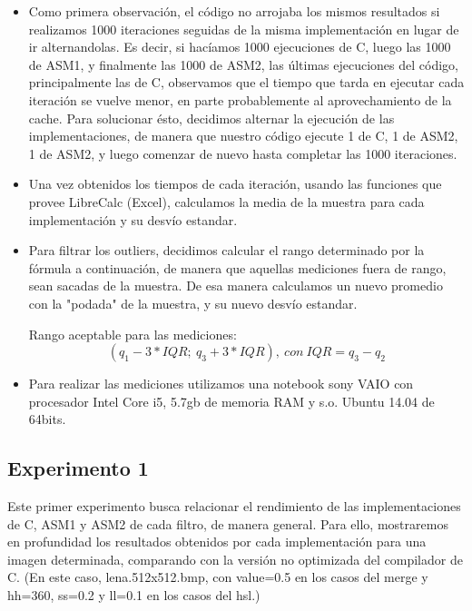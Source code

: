 \begin{itemize}
\item {Como primera observación, el código no arrojaba los mismos resultados si realizamos 1000 iteraciones seguidas de la misma implementación en lugar de ir alternandolas. Es decir, si hacíamos 1000 ejecuciones de C, luego las 1000 de ASM1, y finalmente las 1000 de ASM2, las últimas ejecuciones del código, principalmente las de C, observamos que el tiempo que tarda en ejecutar cada iteración se vuelve menor, en parte probablemente al aprovechamiento de la cache. Para solucionar ésto, decidimos alternar la ejecución de las implementaciones, de manera que nuestro código ejecute 1 de C, 1 de ASM2, 1 de ASM2, y luego comenzar de nuevo hasta completar las 1000 iteraciones.}

\item {Una vez obtenidos los tiempos de cada iteración, usando las funciones que provee LibreCalc (Excel), calculamos la media de la muestra para cada implementación y su desvío estandar.}

\item {Para filtrar los outliers, decidimos calcular el rango determinado por la fórmula a continuación, de manera que aquellas mediciones fuera de rango, sean sacadas de la muestra. De esa manera calculamos un nuevo promedio con la "podada" de la muestra, y su nuevo desvío estandar.}

Rango aceptable para las mediciones: 
\[
(q_{1} - 3*IQR ;\ q_{3} + 3*IQR) ,\ con\ IQR = q_{3} - q_{2}
\]

\item {Para realizar las mediciones utilizamos una notebook sony VAIO con procesador Intel Core i5, 5.7gb de memoria RAM y s.o. Ubuntu 14.04 de 64bits.}

\end{itemize}


\subsection{Experimento 1}

Este primer experimento busca relacionar el rendimiento de las implementaciones de C, ASM1 y ASM2 de cada filtro, de manera general. Para ello, mostraremos en profundidad los resultados obtenidos por cada implementación para una imagen determinada, comparando con la versión no optimizada del compilador de C. (En este caso, lena.512x512.bmp, con value=0.5 en los casos del merge y hh=360, ss=0.2 y ll=0.1 en los casos del hsl.)

